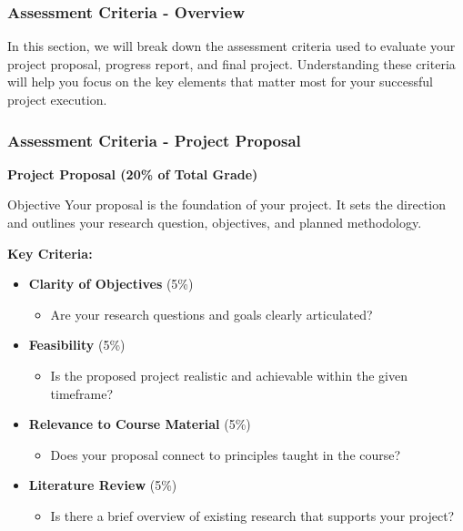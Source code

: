 \documentclass[aspectratio=169]{beamer}
\begin{document}
\begin{frame}[fragile]
    \frametitle{Assessment Criteria - Overview}
    In this section, we will break down the assessment criteria used to evaluate your project proposal, progress report, and final project. Understanding these criteria will help you focus on the key elements that matter most for your successful project execution.
\end{frame}

\begin{frame}[fragile]
    \frametitle{Assessment Criteria - Project Proposal}
    \textbf{Project Proposal (20\% of Total Grade)}

    \begin{block}{Objective}
        Your proposal is the foundation of your project. It sets the direction and outlines your research question, objectives, and planned methodology.
    \end{block}

    \textbf{Key Criteria:}
    \begin{itemize}
        \item \textbf{Clarity of Objectives} (5\%)
        \begin{itemize}
            \item Are your research questions and goals clearly articulated?
        \end{itemize}
        \item \textbf{Feasibility} (5\%)
        \begin{itemize}
            \item Is the proposed project realistic and achievable within the given timeframe?
        \end{itemize}
        \item \textbf{Relevance to Course Material} (5\%)
        \begin{itemize}
            \item Does your proposal connect to principles taught in the course?
        \end{itemize}
        \item \textbf{Literature Review} (5\%)
        \begin{itemize}
            \item Is there a brief overview of existing research that supports your project?
        \end{itemize}
    \end{itemize}
\end{frame}
\end{document}
